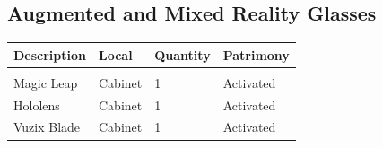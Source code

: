 \subsection{Augmented and Mixed Reality Glasses}
\begin{tabularx}{\textwidth}{ Y  Y  Y  Y }
    \textbf{Description} &  \textbf{Local} &  \textbf{Quantity} & \textbf{Patrimony}\\
    \hline \\
     Magic Leap & Cabinet & 1 & Activated \\
     Hololens & Cabinet & 1 & Activated \\
     Vuzix Blade & Cabinet & 1 & Activated
\end{tabularx}
\vspace{1cm}

